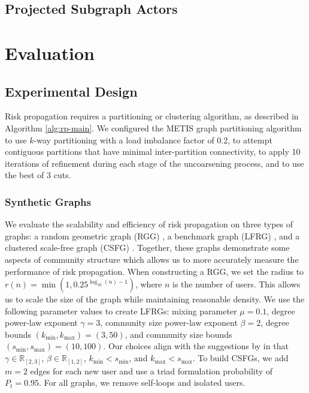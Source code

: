\section{Projected Subgraph Actors}\label{sec:projected-subgraphs}

\chapter{Evaluation}\label{sec:evaluation} %

\section{Experimental Design}

Risk propagation requires a partitioning or clustering algorithm, as described in Algorithm \ref{alg:rp-main}. We configured the METIS graph partitioning algorithm \cite{Karypis1998} to use $k$-way partitioning with a load imbalance factor of 0.2, to attempt contiguous partitions that have minimal inter-partition connectivity, to apply 10 iterations of refinement during each stage of the uncoarsening process, and to use the best of 3 cuts.

\subsection{Synthetic Graphs}\label{sec:synthetic-eval}

We evaluate the scalability and efficiency of risk propagation on three types of graphs: a random geometric graph (RGG) \cite{Dall2002}, a benchmark graph (LFRG) \cite{Lancichinetti2008}, and a clustered scale-free graph (CSFG) \cite{Holme2002}. Together, these graphs demonstrate some aspects of community structure \cite{Fortunato2010} which allows us to more accurately measure the performance of risk propagation. When constructing a RGG, we set the radius to $r(n) = \min \left(1, 0.25^{\log_{10}(n) - 1}\right)$, where $n$ is the number of users. This allows us to scale the size of the graph while maintaining reasonable density. We use the following parameter values to create LFRGs: mixing parameter $\mu = 0.1$, degree power-law exponent $\gamma = 3$, community size power-law exponent $\beta = 2$, degree bounds $(k_{\min}, k_{\max}) = (3, 50)$, and community size bounds $(s_{\min}, s_{\max}) = (10, 100)$. Our choices align with the suggestions by \cite{Lancichinetti2008} in that $\gamma \in \mathbb{R}_{[2, 3]}$,  $\beta \in \mathbb{R}_{[1, 2]}$, $k_{\min} < s_{\min}$, and $k_{\max} < s_{\max}$. To build CSFGs, we add $m = 2$ edges for each new user and use a triad formulation probability of $P_t = 0.95$. For all graphs, we remove self-loops and isolated users.

